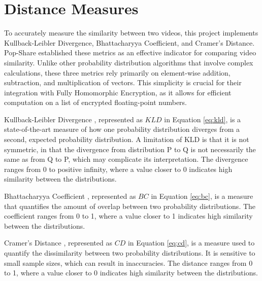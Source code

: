 \section{Distance Measures}

To accurately measure the similarity between two videos, this project implements Kullback-Leibler Divergence, Bhattacharyya Coefficient, and Cramer’s Distance. Pop-Share \cite{Lagesse2021-PopShare} established these metrics as an effective indicator for comparing video similarity. Unlike other probability distribution algorithms that involve complex calculations, these three metrics rely primarily on element-wise addition, subtraction, and multiplication of vectors. This simplicity is crucial for their integration with Fully Homomorphic Encryption, as it allows for efficient computation on a list of encrypted floating-point numbers.

Kullback-Leibler Divergence \cite{Kullback1951-bg}, represented as $KLD$ in Equation \ref{eq:kld}, is a state-of-the-art measure of how one probability distribution diverges from a second, expected probability distribution. A limitation of KLD is that it is not symmetric, in that the divergence from distribution P to Q is not necessarily the same as from Q to P, which may complicate its interpretation. The divergence ranges from 0 to positive infinity, where a value closer to 0 indicates high similarity between the distributions.



Bhattacharyya Coefficient \cite{Bhattacharyya1933-fw}, represented as $BC$ in Equation \ref{eq:bc}, is a measure that quantifies the amount of overlap between two probability distributions. The coefficient ranges from 0 to 1, where a value closer to 1 indicates high similarity between the distributions.



Cramer’s Distance \cite{Cramer1928-sw}, represented as $CD$ in Equation \ref{eq:cd}, is a measure used to quantify the dissimilarity between two probability distributions. It is sensitive to small sample sizes, which can result in inaccuracies. The distance ranges from 0 to 1, where a value closer to 0 indicates high similarity between the distributions.


